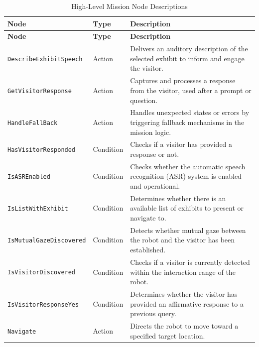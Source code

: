 \documentclass{CSSRforAfrica}
\begin{document}
\begin{longtable}[c]{|p{4.65cm}|p{1.4cm}|p{7.4cm}|}
  \caption{High-Level Mission Node Descriptions} \label{tab:implemented_mission_nodes_custom}\\

  \hline
  \rowcolor{gray!30}
  \small{\textbf{Node}} & \small{\textbf{Type}} & \small{\textbf{Description}} \\ \hline
  \endfirsthead
  \hline
  \rowcolor{gray!30}
  \small{\textbf{Node}} & \small{\textbf{Type}} & \small{\textbf{Description}} \\ \hline
  \endhead

  \small{\texttt{DescribeExhibitSpeech}} & \small{Action} & \small{Delivers an auditory description of the selected exhibit to inform and engage the visitor.} \\ \hline
  \small{\texttt{GetVisitorResponse}} & \small{Action} & \small{Captures and processes a response from the visitor, used after a prompt or question.} \\ \hline
  \small{\texttt{HandleFallBack}} & \small{Action} & \small{Handles unexpected states or errors by triggering fallback mechanisms in the mission logic.} \\ \hline
  \small{\texttt{HasVisitorResponded}} & \small{Condition} & \small{Checks if a visitor has provided a response or not.} \\ \hline
  \small{\texttt{IsASREnabled}} & \small{Condition} & \small{Checks whether the automatic speech recognition (ASR) system is enabled and operational.} \\ \hline
  \small{\texttt{IsListWithExhibit}} & \small{Condition} & \small{Determines whether there is an available list of exhibits to present or navigate to.} \\ \hline
  \small{\texttt{IsMutualGazeDiscovered}} & \small{Condition} & \small{Detects whether mutual gaze between the robot and the visitor has been established.} \\ \hline
  \small{\texttt{IsVisitorDiscovered}} & \small{Condition} & \small{Checks if a visitor is currently detected within the interaction range of the robot.} \\ \hline
  \small{\texttt{IsVisitorResponseYes}} & \small{Condition} & \small{Determines whether the visitor has provided an affirmative response to a previous query.} \\ \hline
  \small{\texttt{Navigate}} & \small{Action} & \small{Directs the robot to move toward a specified target location.} \\ \hline

\end{longtable}
\end{document}
